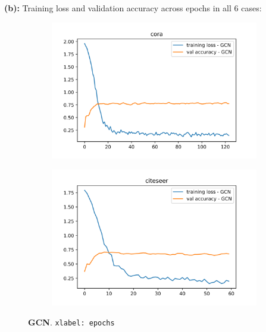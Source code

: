 \documentclass[11pt]{article}
\begin{document}
    \clearpage
    \textbf{(b): } Training loss and validation accuracy across epochs in all 6 cases:%
\vspace{-0.4cm}
    \begin{figure}[H]
        \centering
        \begin{subfigure}{0.5\linewidth}
            \includegraphics[width=1\linewidth]{GCN_cora_best.png}
        \end{subfigure}%
        \begin{subfigure}{0.5\linewidth}
            \includegraphics[width=1\linewidth]{GCN_citeseer_best.png}
        \end{subfigure}
        \caption{\textbf{GCN}. \texttt{xlabel: epochs}}
    \end{figure}%
\vspace{-0.8cm}
\end{document}
